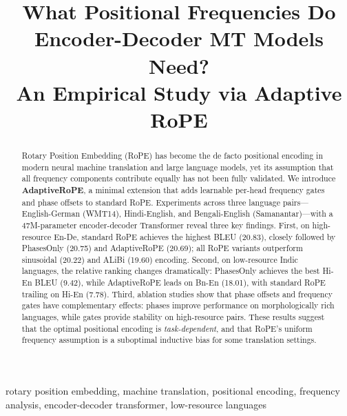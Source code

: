 \documentclass[conference]{IEEEtran}
\begin{document}
\title{What Positional Frequencies Do Encoder-Decoder MT Models Need?\\
An Empirical Study via Adaptive RoPE}

\author{
}

\maketitle

\begin{abstract}
Rotary Position Embedding (RoPE) has become the de facto positional encoding
in modern neural machine translation and large language models, yet its
assumption that all frequency components contribute equally has not been fully
validated. We introduce \textbf{AdaptiveRoPE}, a minimal extension that adds
learnable per-head frequency gates and phase offsets to standard RoPE.
Experiments across three language pairs---English-German (WMT14), Hindi-English,
and Bengali-English (Samanantar)---with a 47M-parameter encoder-decoder
Transformer reveal three key findings. First, on high-resource En-De, standard
RoPE achieves the highest BLEU (20.83), closely followed by PhasesOnly (20.75)
and AdaptiveRoPE (20.69); all RoPE variants outperform sinusoidal (20.22) and
ALiBi (19.60) encoding. Second, on low-resource Indic languages, the relative
ranking changes dramatically: PhasesOnly achieves the best Hi-En BLEU (9.42),
while AdaptiveRoPE leads on Bn-En (18.01), with standard RoPE trailing on
Hi-En (7.78). Third, ablation studies show that phase offsets and frequency
gates have complementary effects: phases improve performance on morphologically
rich languages, while gates provide stability on high-resource pairs. These
results suggest that the optimal positional encoding is \emph{task-dependent},
and that RoPE's uniform frequency assumption is a suboptimal inductive bias
for some translation settings.
\end{abstract}

\begin{IEEEkeywords}
rotary position embedding, machine translation, positional encoding, frequency
analysis, encoder-decoder transformer, low-resource languages
\end{IEEEkeywords}
\end{document}
